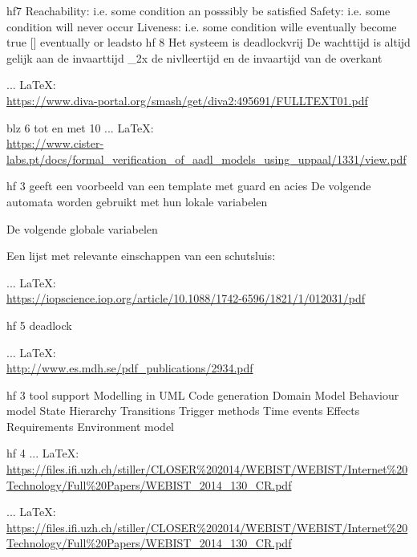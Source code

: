 \begin{thebibliography}{99}
{{{{{{{						hf7
						Reachability: i.e. some condition an posssibly be satisfied
						Safety: i.e. some condition will never occur
						Liveness: i.e. some condition wille eventually become true [] eventually or leadsto
						hf 8
						Het systeem is deadlockvrij
						De wachttijd is altijd gelijk aan de invaarttijd _2x de nivlleertijd en de invaartijd van de overkant
						
						 ... \LaTeX:\\ \url{https://www.diva-portal.org/smash/get/diva2:495691/FULLTEXT01.pdf}
						
						blz 6 tot en met 10
						 ... \LaTeX:\\ \url{https://www.cister-labs.pt/docs/formal_verification_of_aadl_models_using_uppaal/1331/view.pdf}
						
						hf 3 geeft een voorbeeld van een template met guard en acies
						De volgende automata worden gebruikt met hun lokale variabelen
						
						De volgende globale variabelen
						
						Een lijst met relevante einschappen van een schutsluis:
						
						 ... \LaTeX:\\ \url{https://iopscience.iop.org/article/10.1088/1742-6596/1821/1/012031/pdf}
						
						hf 5
						deadlock
						
						 ... \LaTeX:\\ \url{http://www.es.mdh.se/pdf_publications/2934.pdf}
						
						hf 3 tool support
						Modelling in UML
						Code generation
						Domain Model
						Behaviour model
						State Hierarchy
						Transitions
						Trigger methods
						Time events
						Effects
						Requirements
						Environment model
						
						hf 4
						 ... \LaTeX:\\ \url{https://files.ifi.uzh.ch/stiller/CLOSER%202014/WEBIST/WEBIST/Internet%20Technology/Full%20Papers/WEBIST_2014_130_CR.pdf}
						
						
						 ... \LaTeX:\\ \url{https://files.ifi.uzh.ch/stiller/CLOSER%202014/WEBIST/WEBIST/Internet%20Technology/Full%20Papers/WEBIST_2014_130_CR.pdf}
						
						
						
						
}}}}}}}
\end{thebibliography}
